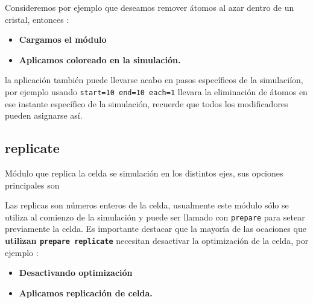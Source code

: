 Consideremos por ejemplo que deseamos remover \'atomos al azar dentro de un cristal, entonces :

\begin{itemize}
 \item \textbf{Cargamos el m\'odulo}
 \item \textbf{Aplicamos coloreado en la simulaci\'on.}
\end{itemize}

la aplicaci\'on tambi\'en puede llevarse acabo en pasos espec\'ificos de la simulaci\'ion, por ejemplo usando \texttt{start=10 end=10 each=1} llevara la eliminaci\'on de \'atomos en ese instante espec\'ifico de la simulaci\'on, recuerde que todos los modificadores pueden asignarse as\'i.

\subsection{replicate}
M\'odulo que replica la celda se simulaci\'on en los distintos ejes, sus opciones principales son


Las replicas son n\'umeros enteros de la celda, usualmente este m\'odulo s\'olo se utiliza al comienzo de la simulaci\'on y puede ser llamado con \verb|prepare| para setear previamente la celda. Es importante destacar que la mayor\'ia de las ocaciones que \textbf{utilizan \texttt{prepare replicate}} necesitan desactivar la optimizaci\'on de la celda, por ejemplo :

\begin{itemize}
 \item \textbf{Desactivando optimizaci\'on}
 \item \textbf{Aplicamos replicaci\'on de celda.}
\end{itemize}

